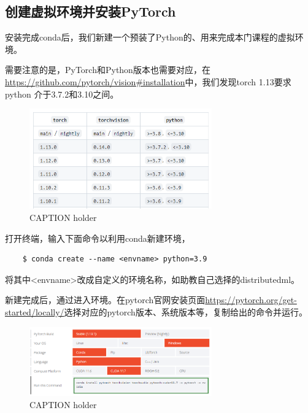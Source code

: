 \subsection{创建虚拟环境并安装PyTorch} \label{subsec:local-env-create}

安装完成conda后，我们新建一个预装了Python的、用来完成本门课程的虚拟环境。

需要注意的是，PyTorch和Python版本也需要对应，在\url{https://github.com/pytorch/vision#installation}中，我们发现torch 1.13要求python 介于3.7.2和3.10之间。

\begin{figure}[htbp]
	\centering
	\includegraphics[width=0.7\textwidth]{figures/pytorch-python-version-compability.png}
	\caption{CAPTION holder}
	\label{LABEL holder}
\end{figure}

打开终端，输入下面命令以利用conda新建环境，
\begin{lstlisting}
    $ conda create --name <envname> python=3.9
\end{lstlisting}
将其中<envname>改成自定义的环境名称，如助教自己选择的distributedml。

新建完成后，通过进入环境。在pytorch官网安装页面\url{https://pytorch.org/get-started/locally/}选择对应的pytorch版本、系统版本等，复制给出的命令并运行。

\begin{figure}[htbp]
	\centering
	\includegraphics[width=0.7\textwidth]{figures/pytorch-install-command.png}
	\caption{CAPTION holder}
	\label{fig:pytorch-install-command}
\end{figure}

